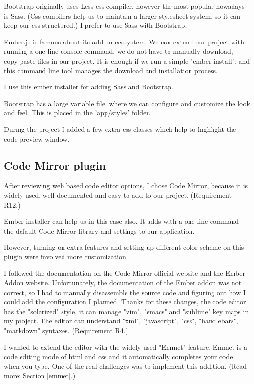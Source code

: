 \documentclass[11pt, a4paper, oneside, openright, medskipamount]{report}
\begin{document}
Bootstrap originally uses Less \cite{less} css compiler, however the most popular nowadays is Sass\cite{sass}. (Css compilers help us to maintain a larger stylesheet system, so it can keep our css structured.) I prefer to use Sass with Bootstrap.

Ember.js is famous about its add-on ecosystem. We can extend our project with running a one line console command, we do not have to manually download, copy-paste files in our project. It is enough if we run a simple "ember install", and this command line tool manages the download and installation process.

I use this ember installer for adding Sass and Bootstrap.

Bootstrap has a large variable file, where we can configure and customize the look and feel. This is placed in the 'app/styles' folder.

During the project I added a few extra css classes which help to highlight the code preview window.

\subsection{Code Mirror plugin}

After reviewing web based code editor options, I chose Code Mirror, because it is widely used, well documented and easy to add to our project. (Requirement R12.)

Ember installer can help us in this case also. It adds with a one line command the default Code Mirror library and settings to our application.

However, turning on extra features and setting up different color scheme on this plugin were involved more customization.

I followed the documentation on the Code Mirror official website and the Ember Addon website. Unfortunately, the documentation of the Ember addon was not correct, so I had to manually disassemble the source code and figuring out how I could add the configuration I planned. Thanks for these changes, the code editor has the "solarized" style, it can manage "vim", "emacs" and "sublime" key maps in my project. The editor can understand "xml", "javascript", "css", "handlebars", "markdown" syntaxes. (Requirement R4.)

I wanted to extend the editor with the widely used "Emmet" feature. Emmet is a code editing mode of html and css and it automatically completes your code when you type. One of the real challenges was to implement this addition. (Read more: Section \ref{emmet}.)
\end{document}

